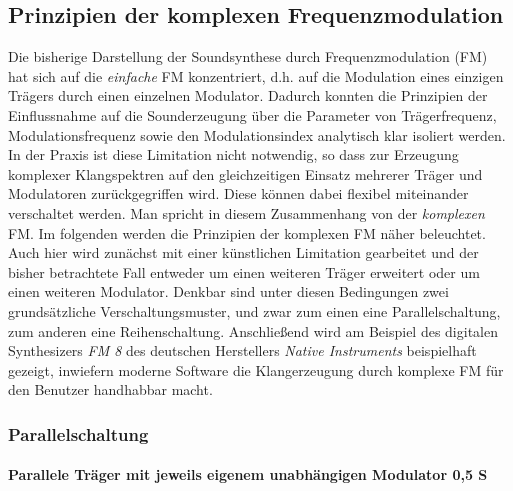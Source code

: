 \subsection{Prinzipien der komplexen Frequenzmodulation}

Die bisherige Darstellung der Soundsynthese durch Frequenzmodulation (FM) hat sich auf die \textit{einfache} FM konzentriert, d.h. auf die Modulation eines einzigen Trägers durch einen einzelnen Modulator. Dadurch konnten die Prinzipien der Einflussnahme auf die Sounderzeugung über die Parameter von Trägerfrequenz, Modulationsfrequenz sowie den Modulationsindex analytisch klar isoliert werden. In der Praxis ist diese Limitation nicht notwendig, so dass zur Erzeugung komplexer Klangspektren auf den gleichzeitigen Einsatz mehrerer Träger und Modulatoren zurückgegriffen wird. Diese können dabei flexibel miteinander verschaltet werden. Man spricht in diesem Zusammenhang von der \textit{komplexen} FM. Im folgenden werden die Prinzipien der komplexen FM näher beleuchtet. Auch hier wird zunächst mit einer künstlichen Limitation gearbeitet und der bisher betrachtete Fall entweder um einen weiteren Träger erweitert oder um einen weiteren Modulator. Denkbar sind unter diesen Bedingungen zwei grundsätzliche Verschaltungsmuster, und zwar zum einen eine Parallelschaltung, zum anderen eine Reihenschaltung. Anschließend wird am Beispiel des digitalen Synthesizers \textit{FM 8} des deutschen Herstellers \textit{Native Instruments} beispielhaft gezeigt, inwiefern moderne Software die Klangerzeugung durch komplexe FM für den Benutzer handhabbar macht. 

\subsubsection{Parallelschaltung}

\paragraph{Parallele Träger mit jeweils eigenem unabhängigen Modulator 0,5 S}$\;$

